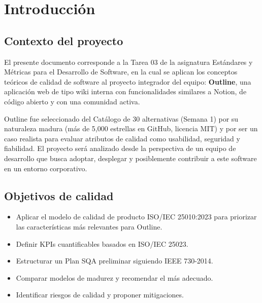 \documentclass[12pt]{article}
\begin{document}

\newpage
\tableofcontents
\newpage

\section{Introducción}

\subsection{Contexto del proyecto}
El presente documento corresponde a la Tarea 03 de la asignatura Estándares y Métricas para el Desarrollo de Software, en la cual se aplican los conceptos teóricos de calidad de software al proyecto integrador del equipo: \textbf{Outline}, una aplicación web de tipo wiki interna con funcionalidades similares a Notion, de código abierto y con una comunidad activa.

Outline fue seleccionado del Catálogo de 30 alternativas (Semana 1) por su naturaleza madura (más de 5,000 estrellas en GitHub, licencia MIT) y por ser un caso realista para evaluar atributos de calidad como usabilidad, seguridad y fiabilidad. El proyecto será analizado desde la perspectiva de un equipo de desarrollo que busca adoptar, desplegar y posiblemente contribuir a este software en un entorno corporativo.

\subsection{Objetivos de calidad}
\begin{itemize}
    \item Aplicar el modelo de calidad de producto ISO/IEC 25010:2023 para priorizar las características más relevantes para Outline.
    \item Definir KPIs cuantificables basados en ISO/IEC 25023.
    \item Estructurar un Plan SQA preliminar siguiendo IEEE 730-2014.
    \item Comparar modelos de madurez y recomendar el más adecuado.
    \item Identificar riesgos de calidad y proponer mitigaciones.
\end{itemize}
\end{document}
